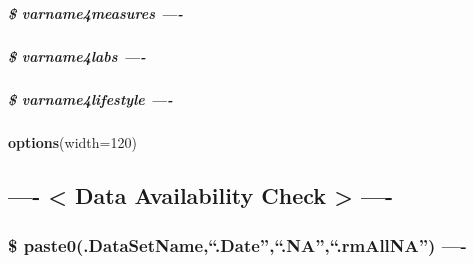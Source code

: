 \documentclass[
]{article}
\newenvironment{Shaded}{\begin{snugshade}}{\end{snugshade}}
\newcommand{\AttributeTok}[1]{\textcolor[rgb]{0.13,0.29,0.53}{#1}}
\newcommand{\DecValTok}[1]{\textcolor[rgb]{0.00,0.00,0.81}{#1}}
\newcommand{\FunctionTok}[1]{\textcolor[rgb]{0.13,0.29,0.53}{\textbf{#1}}}
\newcommand{\NormalTok}[1]{#1}
\begin{document}
\hypertarget{varname4measures--}{%
\subparagraph{\$ varname4measures ----}\label{varname4measures--}}

\hypertarget{varname4labs--}{%
\subparagraph{\$ varname4labs ----}\label{varname4labs--}}

\hypertarget{varname4lifestyle--}{%
\subparagraph{\$ varname4lifestyle ----}\label{varname4lifestyle--}}

\begin{Shaded}
\begin{Highlighting}[]
\FunctionTok{options}\NormalTok{(}\AttributeTok{width=}\DecValTok{120}\NormalTok{)}
\end{Highlighting}
\end{Shaded}

\hypertarget{data-availability-check--}{%
\subsection{---- \textless{} Data Availability Check \textgreater{}
----}\label{data-availability-check--}}

\hypertarget{paste0.datasetname.date.na.rmallna--}{%
\subsubsection{\$ paste0(.DataSetName,``.Date'',``.NA'',``.rmAllNA'')
----}\label{paste0.datasetname.date.na.rmallna--}}
\end{document}
